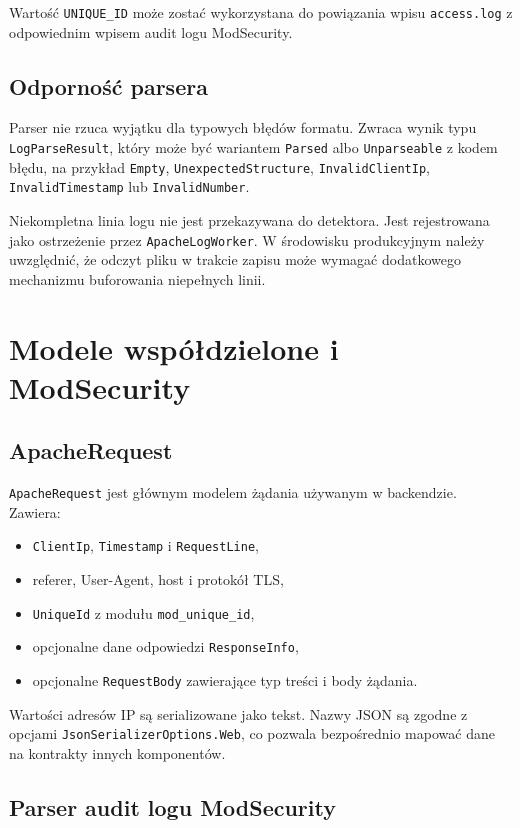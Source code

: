 \documentclass[12pt,a4paper]{article}
\newcommand{\code}[1]{\texttt{#1}}
\begin{document}
Wartość \code{UNIQUE\_ID} może zostać wykorzystana do powiązania wpisu
\code{access.log} z odpowiednim wpisem audit logu ModSecurity.

\subsection{Odporność parsera}

Parser nie rzuca wyjątku dla typowych błędów formatu. Zwraca wynik typu
\code{LogParseResult}, który może być wariantem \code{Parsed} albo
\code{Unparseable} z kodem błędu, na przykład \code{Empty},
\code{UnexpectedStructure}, \code{InvalidClientIp}, \code{InvalidTimestamp}
lub \code{InvalidNumber}.

Niekompletna linia logu nie jest przekazywana do detektora. Jest rejestrowana
jako ostrzeżenie przez \code{ApacheLogWorker}. W środowisku produkcyjnym należy
uwzględnić, że odczyt pliku w trakcie zapisu może wymagać dodatkowego mechanizmu
buforowania niepełnych linii.

\section{Modele współdzielone i ModSecurity}

\subsection{ApacheRequest}

\code{ApacheRequest} jest głównym modelem żądania używanym w backendzie. Zawiera:
\begin{itemize}
    \item \code{ClientIp}, \code{Timestamp} i \code{RequestLine},
    \item referer, User-Agent, host i protokół TLS,
    \item \code{UniqueId} z modułu \code{mod\_unique\_id},
    \item opcjonalne dane odpowiedzi \code{ResponseInfo},
    \item opcjonalne \code{RequestBody} zawierające typ treści i body żądania.
\end{itemize}

Wartości adresów IP są serializowane jako tekst. Nazwy JSON są zgodne z opcjami
\code{JsonSerializerOptions.Web}, co pozwala bezpośrednio mapować dane na kontrakty
innych komponentów.

\subsection{Parser audit logu ModSecurity}
\end{document}
